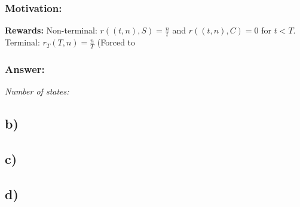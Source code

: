 \documentclass{article}
\begin{document}
\subsubsection*{Motivation:}
\textbf{Rewards:} Non-terminal: $r((t,n), S) = \frac{n}{t}$ and $r((t, n), C) = 0$
for $t < T$. \\
Terminal: $r_T (T, n) = \frac{n}{T}$ (Forced to 




\subsubsection*{Answer:}
\textit{Number of states:}

\subsection*{b)}
\subsection*{c)}
\subsection*{d)}
\end{document}
